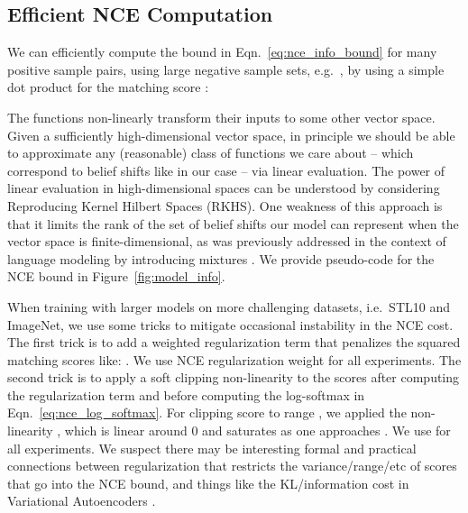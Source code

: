 \documentclass{article}
\begin{document}
\subsection{Efficient NCE Computation}
We can efficiently compute the bound in Eqn.~\ref{eq:nce_info_bound} for many positive sample pairs, using large negative sample sets, e.g.~, by using a simple dot product for the matching score :

The functions  non-linearly transform their inputs to some other vector space.
Given a sufficiently high-dimensional vector space, in principle we should be able to approximate any (reasonable) class of functions we care about -- which correspond to belief shifts like  in our case -- via linear evaluation.
The power of linear evaluation in high-dimensional spaces can be understood by considering Reproducing Kernel Hilbert Spaces (RKHS).
One weakness of this approach is that it limits the rank of the set of belief shifts our model can represent when the vector space is finite-dimensional, as was previously addressed in the context of language modeling by introducing mixtures \citep{Yang2018}.
We provide pseudo-code for the NCE bound in Figure~\ref{fig:model_info}.

When training with larger models on more challenging datasets, i.e.~STL10 and ImageNet, we use some tricks to mitigate occasional instability in the NCE cost.
The first trick is to add a weighted regularization term that penalizes the squared matching scores like: .
We use NCE regularization weight  for all experiments.
The second trick is to apply a soft clipping non-linearity to the scores after computing the regularization term and before computing the log-softmax in Eqn.~\ref{eq:nce_log_softmax}.
For clipping score  to range , we applied the non-linearity , which is linear around 0 and saturates as one approaches . We use  for all experiments. We suspect there may be interesting formal and practical connections between regularization that restricts the variance/range/etc of scores that go into the NCE bound, and things like the KL/information cost in Variational Autoencoders \citep{kingma2013auto}.
\end{document}
